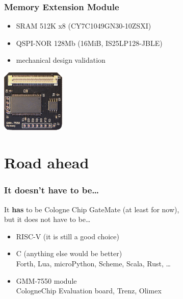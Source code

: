 \begin{frame}
  \frametitle{Memory Extension Module}

  \begin{minipage}{9cm}
  \begin{itemize}
  \item SRAM 512K x8 (CY7C1049GN30-10ZSXI)
  \item QSPI-NOR 128Mb (16MiB, IS25LP128-JBLE)
  \vspace{.5cm}
  \item mechanical design validation
  \end{itemize}
  \end{minipage}

  \vspace{-1cm}
  \begin{flushright}
    \includegraphics[height=3cm]{mem-module.jpg}
  \end{flushright}

\end{frame}

\section{Road ahead}

\begin{frame}
\frametitle{It doesn't have to be\dots}
It \textbf{has} to be Cologne Chip GateMate (at least for now),\\
but it does not have to be\dots
\begin{itemize}
\item RISC-V (it is still a good choice)
\item C (anything else would be better)\\Forth, Lua, microPython,
Scheme, Scala, Rust, \dots
\item GMM-7550 module\\CologneChip Evaluation board, Trenz, Olimex
\end{itemize}
\end{frame}

